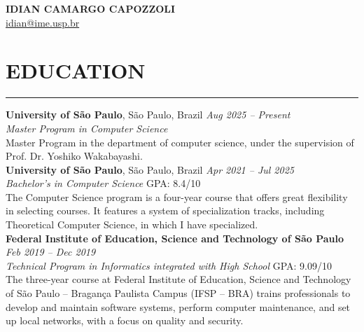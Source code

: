\documentclass[a4paper,10pt]{article}
\begin{document}
\begin{center}
    {\LARGE \textbf{IDIAN CAMARGO CAPOZZOLI}} \\
    \vspace{0.2cm}
    \href{mailto:idian@ime.usp.br}{idian@ime.usp.br}

\end{center}

\section*{EDUCATION}
\vspace{-1.5em} %
\noindent\rule{\textwidth}{0.4pt} %

\noindent\textbf{University of São Paulo}, São Paulo, Brazil \hfill  \textit{Aug 2025 -- Present} \\
\textit{Master Program in Computer Science} \hfill \\
Master Program in the department of computer science, under the supervision of Prof. Dr. Yoshiko Wakabayashi. \\

\noindent\textbf{University of São Paulo}, São Paulo, Brazil \hfill  \textit{Apr 2021 -- Jul 2025} \\
\textit{Bachelor's in Computer Science} \hfill GPA: 8.4/10 \\
The Computer Science program is a four-year course that offers great flexibility in selecting courses. It features a system of specialization tracks, including Theoretical Computer Science, in which I have specialized. \\

\noindent\textbf{Federal Institute of Education, Science and Technology of São Paulo} \hfill  \textit{Feb 2019 -- Dec 2019} \\
\textit{Technical Program in Informatics integrated with High School} \hfill GPA: 9.09/10 \\
The three-year course at Federal Institute of Education, Science and Technology of São Paulo -- Bragança Paulista Campus (IFSP -- BRA) trains professionals to develop and maintain software systems, perform computer maintenance, and set up local networks, with a focus on quality and security.


\end{document}
